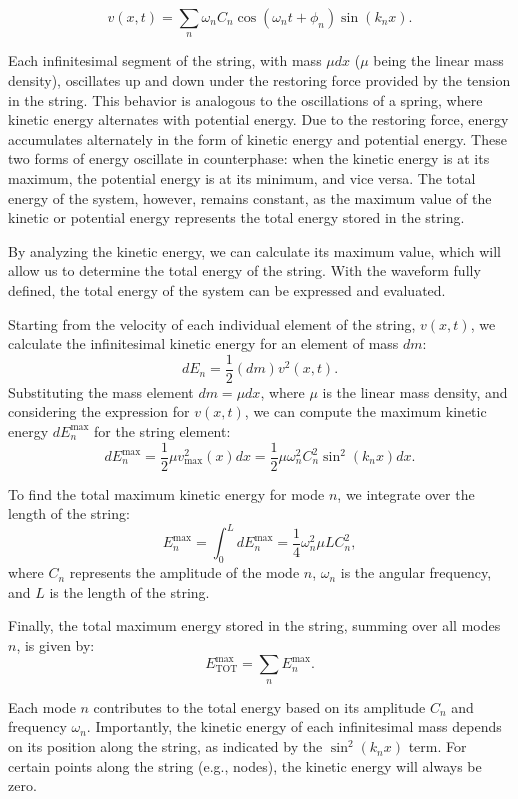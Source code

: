 \documentclass[a4paper]{article}
\begin{document}
\[
v(x, t) = \sum_{n} \omega_n C_n \cos(\omega_n t + \phi_n) \sin(k_n x).
\]

Each infinitesimal segment of the string, with mass \( \mu dx \) (\( \mu \) being the linear mass density), oscillates up and down under the restoring force provided by the tension in the string. This behavior is analogous to the oscillations of a spring, where kinetic energy alternates with potential energy. Due to the restoring force, energy accumulates alternately in the form of kinetic energy and potential energy. These two forms of energy oscillate in counterphase: when the kinetic energy is at its maximum, the potential energy is at its minimum, and vice versa. The total energy of the system, however, remains constant, as the maximum value of the kinetic or potential energy represents the total energy stored in the string.

By analyzing the kinetic energy, we can calculate its maximum value, which will allow us to determine the total energy of the string. With the waveform fully defined, the total energy of the system can be expressed and evaluated.



Starting from the velocity of each individual element of the string, \(v(x,t)\), we calculate the infinitesimal kinetic energy for an element of mass \(dm\):
\[
dE_{n} = \frac{1}{2} (dm) v^2(x,t).
\]
Substituting the mass element \(dm = \mu dx\), where \(\mu\) is the linear mass density, and considering the expression for \(v(x,t)\), we can compute the maximum kinetic energy \(dE_{n}^{\text{max}}\) for the string element:
\[
dE_{n}^{\text{max}} = \frac{1}{2} \mu v_{\text{max}}^2(x) dx = \frac{1}{2} \mu \omega_n^2 C_n^2 \sin^2(k_n x) dx.
\]

To find the total maximum kinetic energy for mode \(n\), we integrate over the length of the string:
\[
E_{n}^{\text{max}} = \int_0^L dE_{n}^{\text{max}} = \frac{1}{4} \omega_n^2 \mu L C_n^2,
\]
where \(C_n\) represents the amplitude of the mode \(n\), \(\omega_n\) is the angular frequency, and \(L\) is the length of the string.

Finally, the total maximum energy stored in the string, summing over all modes \(n\), is given by:
\[
E_{\text{TOT}}^{\text{max}} = \sum_{n} E_{n}^{\text{max}}.
\]

Each mode \(n\) contributes to the total energy based on its amplitude \(C_n\) and frequency \(\omega_n\). Importantly, the kinetic energy of each infinitesimal mass depends on its position along the string, as indicated by the \(\sin^2(k_n x)\) term. For certain points along the string (e.g., nodes), the kinetic energy will always be zero.
\end{document}

